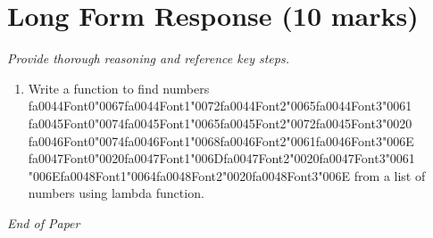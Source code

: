 \documentclass[12pt]{article}
\begin{document}
\section*{Long Form Response (10 marks)}
\textit{Provide thorough reasoning and reference key steps.}
\begin{enumerate}[label=\arabic*.]
\item Write a function to find numbers {\csname fa0044Font0\endcsname\char"0067}{\csname fa0044Font1\endcsname\char"0072}{\csname fa0044Font2\endcsname\char"0065}{\csname fa0044Font3\endcsname\char"0061} {\csname fa0045Font0\endcsname\char"0074}{\csname fa0045Font1\endcsname\char"0065}{\csname fa0045Font2\endcsname\char"0072}{\csname fa0045Font3\endcsname\char"0020} {\csname fa0046Font0\endcsname\char"0074}{\csname fa0046Font1\endcsname\char"0068}{\csname fa0046Font2\endcsname\char"0061}{\csname fa0046Font3\endcsname\char"006E} {\csname fa0047Font0\endcsname\char"0020}{\csname fa0047Font1\endcsname\char"006D}{\csname fa0047Font2\endcsname\char"0020}{\csname fa0047Font3\endcsname\char"0061} {\char"006E}{\csname fa0048Font1\endcsname\char"0064}{\csname fa0048Font2\endcsname\char"0020}{\csname fa0048Font3\endcsname\char"006E} from a list of numbers using lambda
function.
\end{enumerate}

\vfill
\noindent\textit{End of Paper}
\end{document}
